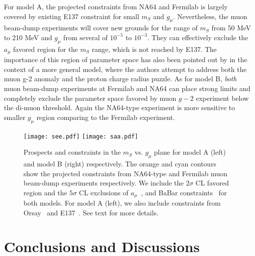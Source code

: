 \documentclass[prd,onecolumn,notitlepage,
nofootinbib,aps,tightenlines,
preprintnumbers,amsmath,amssymb,amsfonts,showpacs,superscriptaddress]{revtex4-1}
\begin{document}
For model A, the projected constraints from NA64 and Fermilab is largely covered by existing E137 constraint for small $m_S$ and $g_\mu$.  Nevertheless, the muon beam-dump experiments will cover new grounds 
for the range of $m_S$ from 50 MeV to 210 MeV and $g_\mu$ from several of $10^{-5}$ to $10^{-3}$. They can effectively exclude the $a_\mu$ favored region for the $m_S$ range, which is not reached by E137. The importance of this region of parameter space has also been pointed out by \cite{Liu:2016qwd} in the
context of a more general model, where the authors attempt to address both the muon g-2 anomaly
 and the proton charge radius puzzle. As for model B, \emph{both} muon beam-dump experiments at Fermilab and NA64 can place strong limits and completely exclude the parameter space favored by muon $g-2$ experiment below the di-muon threshold. Again the NA64-type experiment is more sensitive to smaller $g_\mu$ region comparing to the Fermilab experiment. 
%



\begin{figure}[t]
\centering
\texttt{[image: see.pdf]}
\texttt{[image: saa.pdf]}
\caption{\label{fig:gmu_ms} Prospects and constraints in the $m_S$ vs. $g_\mu$ plane for model A  (left) and model B  (right) respectively. The orange and cyan contours show the projected constraints from NA64-type and Fermilab muon beam-dump experiments respectively.
We include the  $2\sigma$ CL favored region and the $5\sigma$ CL  exclusions of $a_\mu$~\cite{Grange:2015fou,Mibe:2010zz}, and BaBar constraints~\cite{TheBABAR:2016rlg} for both models. For model A (left), we also include constraints from Orsay~\cite{Davier:1989wz} and E137~\cite{Bjorken:1988as}. See text for more details.
}
\end{figure}



\section{Conclusions and Discussions}
\label{conclusions}
\end{document}
